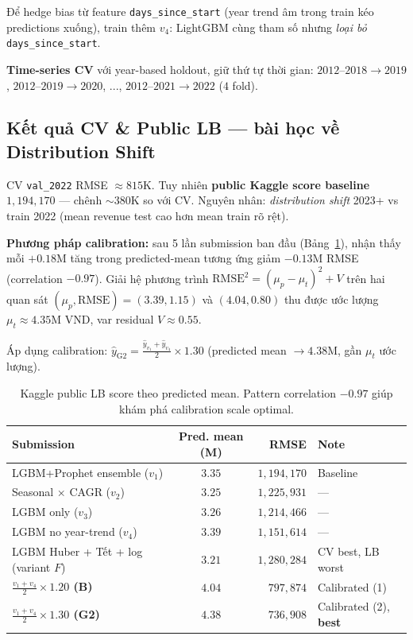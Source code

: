 \documentclass[10pt]{article}
\begin{document}
Để hedge bias từ feature \texttt{days\_since\_start} (year trend âm trong train kéo predictions xuống), train thêm $v_4$: LightGBM cùng tham số nhưng \emph{loại bỏ} \texttt{days\_since\_start}.

\textbf{Time-series CV} với year-based holdout, giữ thứ tự thời gian:
$2012$--$2018 \!\to\! 2019$, $2012$--$2019 \!\to\! 2020$, ..., $2012$--$2021 \!\to\! 2022$ ($4$ fold).

\subsection{Kết quả CV \& Public LB --- bài học về Distribution Shift}

CV \texttt{val\_2022} RMSE $\approx 815$K. Tuy nhiên \textbf{public Kaggle score baseline $1{,}194{,}170$} --- chênh $\sim 380$K so với CV. Nguyên nhân: \emph{distribution shift} 2023+ vs train 2022 (mean revenue test cao hơn mean train rõ rệt).

\textbf{Phương pháp calibration:} sau 5 lần submission ban đầu (Bảng~\ref{tab:lb}), nhận thấy mỗi $+0.18$M tăng trong predicted-mean tương ứng giảm $-0.13$M RMSE (correlation $-0.97$). Giải hệ phương trình $\text{RMSE}^2 = (\mu_p - \mu_t)^2 + V$ trên hai quan sát $(\mu_p, \text{RMSE}) = (3.39, 1.15)$ và $(4.04, 0.80)$ thu được ước lượng $\mu_t \approx 4.35$M VND, var residual $V \approx 0.55$.

Áp dụng calibration: $\hat y_{\text{G2}} = \frac{\hat y_{v_1} + \hat y_{v_4}}{2} \times 1.30$ (predicted mean $\to 4.38$M, gần $\mu_t$ ước lượng).

\begin{table}[h]
\centering
\footnotesize
\caption{Kaggle public LB score theo predicted mean. Pattern correlation $-0.97$ giúp khám phá calibration scale optimal.}
\label{tab:lb}
\begin{tabular}{lcrl}
\toprule
\textbf{Submission} & \textbf{Pred. mean (M)} & \textbf{RMSE} & \textbf{Note} \\
\midrule
LGBM+Prophet ensemble ($v_1$)             & $3.35$ & $1{,}194{,}170$ & Baseline \\
Seasonal $\times$ CAGR ($v_2$)            & $3.25$ & $1{,}225{,}931$ & --- \\
LGBM only ($v_3$)                          & $3.26$ & $1{,}214{,}466$ & --- \\
LGBM no year-trend ($v_4$)                 & $3.39$ & $1{,}151{,}614$ & --- \\
LGBM Huber + Tết + log (variant $F$)       & $3.21$ & $1{,}280{,}284$ & CV best, LB worst \\
\midrule
\textbf{$\frac{v_1+v_4}{2} \times 1.20$ (B)}    & $4.04$ & \textbf{$797{,}874$}  & Calibrated (1) \\
\textbf{$\frac{v_1+v_4}{2} \times 1.30$ (G2)}   & $4.38$ & \textbf{$736{,}908$}  & Calibrated (2), \textbf{best} \\
\bottomrule
\end{tabular}
\end{table}
\end{document}
